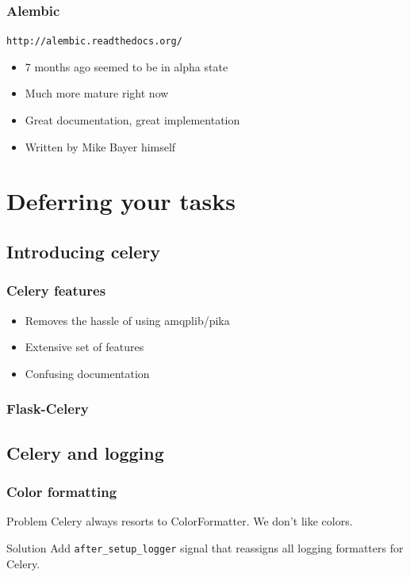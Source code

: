 \documentclass{beamer}
\begin{document}
\begin{frame}
  \frametitle{Alembic}
  \texttt{http://alembic.readthedocs.org/}
  \begin{itemize}
  \item 7 months ago seemed to be in alpha state
  \item Much more mature right now
  \item Great documentation, great implementation
  \item Written by Mike Bayer himself
  \end{itemize}
\end{frame}

\section{Deferring your tasks}

\subsection{Introducing celery}

\begin{frame}
  \frametitle{Celery features}
  \begin{itemize}
  \item Removes the hassle of using amqplib/pika
  \item Extensive set of features
  \item Confusing documentation
  \end{itemize}
\end{frame}

\begin{frame}
  \frametitle{Flask-Celery}
\end{frame}


\subsection{Celery and logging}

\begin{frame}
  \frametitle{Color formatting}
  \begin{block}{Problem}
    Celery always resorts to ColorFormatter. We don't like colors.
  \end{block}
  \begin{block}{Solution}
    Add \texttt{after\_setup\_logger} signal that reassigns all
    logging formatters for Celery.
  \end{block}
\end{frame}
\end{document}
